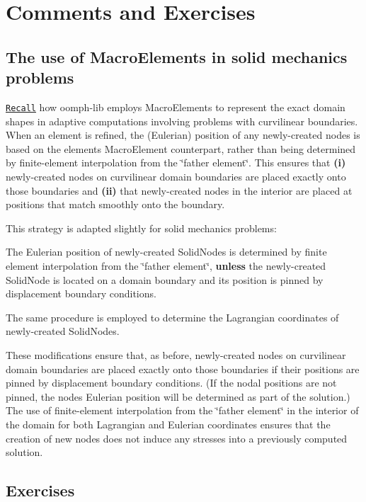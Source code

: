  

\hypertarget{index_comm_and_ex}{}\section{Comments and Exercises}\label{index_comm_and_ex}
\hypertarget{index_macro}{}\subsection{The use of Macro\+Elements in solid mechanics problems}\label{index_macro}
\href{../../../poisson/fish_poisson2/html/index.html}{\tt Recall} how {\ttfamily oomph-\/lib} employs {\ttfamily Macro\+Elements} to represent the exact domain shapes in adaptive computations involving problems with curvilinear boundaries. When an element is refined, the (Eulerian) position of any newly-\/created nodes is based on the element\textquotesingle{}s {\ttfamily Macro\+Element} counterpart, rather than being determined by finite-\/element interpolation from the \char`\"{}father element\char`\"{}. This ensures that {\bfseries (i)} newly-\/created nodes on curvilinear domain boundaries are placed exactly onto those boundaries and {\bfseries (ii)} that newly-\/created nodes in the interior are placed at positions that match smoothly onto the boundary.

This strategy is adapted slightly for solid mechanics problems\+:
\begin{DoxyEnumerate}
\item The Eulerian position of newly-\/created {\ttfamily Solid\+Nodes} is determined by finite element interpolation from the \char`\"{}father element\char`\"{}, {\bfseries unless} the newly-\/created {\ttfamily Solid\+Node} is located on a domain boundary and its position is pinned by displacement boundary conditions. ~\newline
~\newline

\item The same procedure is employed to determine the Lagrangian coordinates of newly-\/created {\ttfamily Solid\+Nodes}.
\end{DoxyEnumerate}These modifications ensure that, as before, newly-\/created nodes on curvilinear domain boundaries are placed exactly onto those boundaries if their positions are pinned by displacement boundary conditions. (If the nodal positions are not pinned, the node\textquotesingle{}s Eulerian position will be determined as part of the solution.) The use of finite-\/element interpolation from the \char`\"{}father element\char`\"{} in the interior of the domain for both Lagrangian and Eulerian coordinates ensures that the creation of new nodes does not induce any stresses into a previously computed solution.\hypertarget{index_ex}{}\subsection{Exercises}\label{index_ex}

